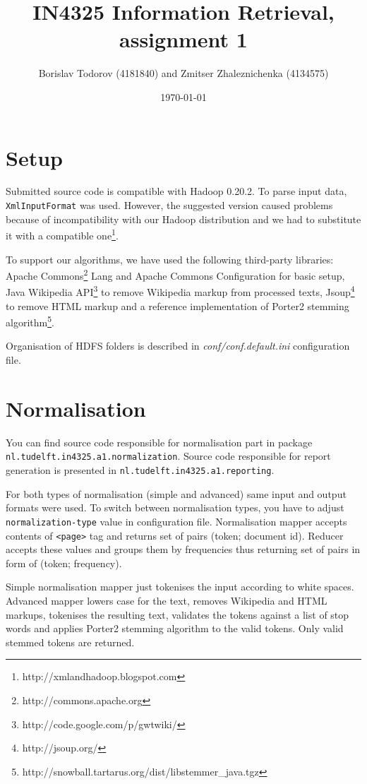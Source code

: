 \documentclass[a4paper, notitlepage]{report}
\begin{document}
\title{IN4325 Information Retrieval, assignment 1}
\author{Borislav Todorov (4181840) and Zmitser Zhaleznichenka (4134575)}
\date{\today}
\maketitle

\section{Setup}

Submitted source code is compatible with Hadoop 0.20.2. To parse input data, \lstinline{XmlInputFormat} was used. However, the suggested version caused problems because of incompatibility with our Hadoop distribution and we had to substitute it with a compatible one\footnote{http://xmlandhadoop.blogspot.com}.

To support our algorithms, we have used the following third-party libraries: Apache Commons\footnote{http://commons.apache.org} Lang and Apache Commons Configuration for basic setup, Java Wikipedia API\footnote{http://code.google.com/p/gwtwiki/} to remove Wikipedia markup from processed texts, Jsoup\footnote{http://jsoup.org/} to remove HTML markup and a reference implementation of Porter2 stemming algorithm\footnote{http://snowball.tartarus.org/dist/libstemmer\_java.tgz}.

Organisation of HDFS folders is described in \emph{conf/conf.default.ini} configuration file.

\section{Normalisation}

You can find source code responsible for normalisation part in package \lstinline{nl.tudelft.in4325.a1.normalization}. Source code responsible for report generation is presented in \lstinline{nl.tudelft.in4325.a1.reporting}.

For both types of normalisation (simple and advanced) same input and output formats were used. To switch between normalisation types, you have to adjust \lstinline{normalization-type} value in configuration file. Normalisation mapper accepts contents of \lstinline{<page>} tag and returns set of pairs (token; document id). Reducer accepts these values and groups them by frequencies thus returning set of pairs in form of (token; frequency).

Simple normalisation mapper just tokenises the input according to white spaces. Advanced mapper lowers case for the text, removes Wikipedia and HTML markups, tokenises the resulting text, validates the tokens against a list of stop words and applies Porter2 stemming algorithm to the valid tokens. Only valid stemmed tokens are returned.
\end{document}
